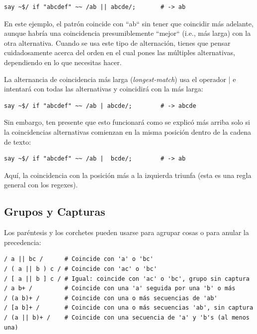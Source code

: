 \begin{verbatim}
say ~$/ if "abcdef" ~~ /ab || abcde/;       # -> ab
\end{verbatim}
%

En este ejemplo, el patrón coincide con ``ab`` sin tener que
coincidir más adelante, aunque habría una coincidencia 
presumiblemente ``mejor`` (i.e., más larga) con la otra alternativa.
Cuando se usa este tipo de alternación, tienes que pensar 
cuidadosamente acerca del orden en el cual pones las múltiples
alternativas, dependiendo en lo que necesitas hacer.

La alternancia de coincidencia más larga (\emph{longest-match}) usa 
el operador \verb||| e intentará con todas las alternativas y 
coincidirá con la más larga:

\begin{verbatim}
say ~$/ if "abcdef" ~~ /ab | abcde/;        # -> abcde
\end{verbatim}
%

Sin embargo, ten presente que esto funcionará como se explicó
más arriba solo si la coincidencias alternativas comienzan 
en la misma posición dentro de la cadena de texto:

\begin{verbatim}
say ~$/ if "abcdef" ~~ /ab |  bcde/;        # -> ab
\end{verbatim}
%

Aquí, la coincidencia con la posición más a la izquierda 
triunfa (esta es una regla general con los regexes).


\subsection{Grupos y Capturas }

Los paréntesis y los corchetes pueden usarse para agrupar
cosas o para anular la precedencia:

\begin{verbatim}
/ a || bc /      # Coincide con 'a' o 'bc'
/ ( a || b ) c / # Coincide con 'ac' o 'bc'
/ [ a || b ] c / # Igual: coincide con 'ac' o 'bc', grupo sin captura
/ a b+ /         # Coincide con una 'a' seguida por una 'b' o más
/ (a b)+ /       # Coincide con una o más secuencias de 'ab'
/ [a b]+ /       # Coincide con una o más secuencias 'ab', sin captura
/ (a || b)+ /    # Coincide con una secuencia de 'a' y 'b's (al menos una)
\end{verbatim}
%

